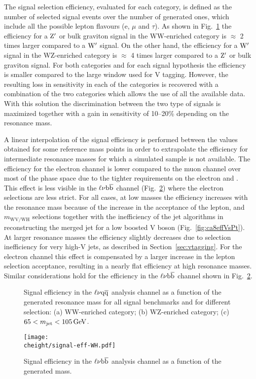 The signal selection efficiency, evaluated for each category, is defined as the number of selected signal events over the number of generated ones, which include all the possible lepton flavours (e, $\mu$ and $\tau$).
As shown in Fig.~\ref{fig:effWV-13TeV} the efficiency for a $\mathrm{Z}^\prime$ or bulk graviton signal in the WW-enriched category is $\approx$ 2 times larger compared to a $\mathrm{W}^\prime$ signal. On the other hand, the efficiency for a $\mathrm{W}^\prime$ signal in the WZ-enriched category is $\approx$ 4 times larger compared to a $\mathrm{Z}^\prime$ or bulk graviton signal. For both categories and for each signal hypothesis the efficiency is smaller compared to the large \mJ window used for V tagging. However, the resulting loss in sensitivity in each of the categories is recovered with a combination of the two \mJ categories which allows the use of all the available data. With this solution the discrimination between the two type of signals is maximized together with a gain in sensitivity of 10--20\% depending on the resonance mass.

A linear interpolation of the signal efficiency is performed between the values obtained for some reference mass points in order to extrapolate the efficiency for intermediate resonance masses for which a simulated sample is not available.
The efficiency for the electron channel is lower compared to the muon channel over most of the phase space due to the tighter requirements on the electron \pt and \ETmiss. This effect is less visible in the $\ell\nu{\mathrm{b}\overline{\mathrm{b}}}$ channel (Fig.~\ref{fig:effWH-8TeV}) where the electron selections are less strict. For all cases, at low masses the efficiency increases with the resonance mass because of the increase in the acceptance of the lepton, \ETmiss and $m_\mathrm{WV/WH}$ selections together with the inefficiency of the jet algorithms in reconstructing the merged jet for a low boosted V boson (Fig.~\ref{fig:ca8effVsPt}). At larger resonance masses the efficiency slightly decreases due to \nsubj selection inefficiency for very high-\pt V jets, as described in Section~\ref{sec:vtagging}.
For the electron channel this effect is compensated by a larger increase in the lepton selection acceptance, resulting in a nearly flat efficiency at high resonance masses.
Similar considerations hold for the efficiency in the $\ell\nu{\mathrm{b}\overline{\mathrm{b}}}$ channel shown in Fig.~\ref{fig:effWH-8TeV}.

\begin{figure}[!htb]
\centering
{}
\caption{Signal efficiency in the $\ell\nu\mathrm{q}\overline{\mathrm{q}}$ analysis channel as a function of the generated resonance mass for all signal benchmarks and for different \mJ selection: (a) WW-enriched category; (b) WZ-enriched category; (c) $65 < m_{\text{jet}} < 105\,\text{Ge\hspace{-.08em}V}$.}
\label{fig:effWV-13TeV}
\end{figure}

\begin{figure}[!htb]
\centering
\texttt{[image: \\cheight/signal-eff-WH.pdf]}
\caption{Signal efficiency in the $\ell\nu{\mathrm{b}\overline{\mathrm{b}}}$ analysis channel as a function of the generated \Wpr mass.}
\label{fig:effWH-8TeV}
\end{figure}
